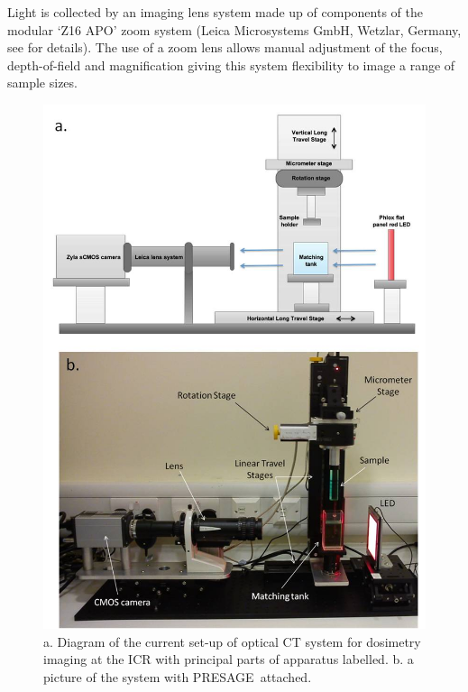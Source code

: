 Light is collected by an imaging lens system made up of  components of the modular `Z16 APO' zoom system  (Leica Microsystems GmbH, Wetzlar, Germany, see \cite{Doran:2010hn} for details). The use of a zoom lens allows manual adjustment of the focus, depth-of-field and magnification giving this system flexibility to image a range of sample sizes. 

	\begin{figure}
	\centering
	\includegraphics[width = \textwidth]{meth_img/Dosimetry_setup}
	\caption{a. Diagram of the current set-up of optical CT system for dosimetry imaging at the ICR with principal parts of apparatus labelled. b. a picture of the system with PRESAGE\textregistered \ attached.}
	\label{fig:setup_pic}
	\end{figure}

